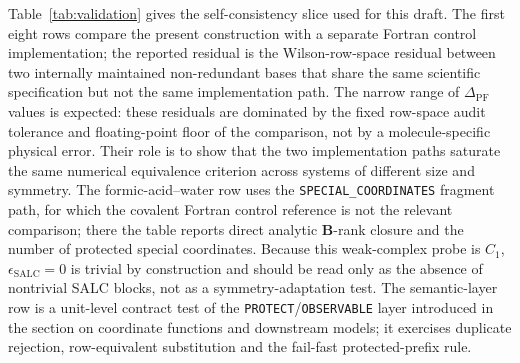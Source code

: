 \documentclass[journal=jctcce,manuscript=article,layout=traditional]{achemso}
\newcommand{\Bmat}{\mathbf{B}}
\theoremstyle{definition}
\begin{document}
Table~\ref{tab:validation} gives the self-consistency slice used for
this draft.  The first eight rows compare the present construction with a
separate Fortran control implementation; the reported residual is the
Wilson-row-space residual between two internally maintained non-redundant bases
that share the same scientific specification but not the same implementation
path.
The narrow range of
\(\Delta_\mathrm{PF}\) values is expected: these residuals are dominated by the
fixed row-space audit tolerance and floating-point floor of the comparison, not
by a molecule-specific physical error.  Their role is to show that the two
implementation paths saturate the same numerical equivalence criterion across
systems of different size and symmetry.  The formic-acid--water row uses the
\texttt{SPECIAL\_COORDINATES} fragment path, for which the covalent Fortran
control reference is not the relevant comparison; there the table reports direct
analytic \(\Bmat\)-rank closure and the number of protected special coordinates.
Because this weak-complex probe is \(C_1\), \(\epsilon_\mathrm{SALC}=0\) is
trivial by construction and should be read only as the absence of nontrivial
SALC blocks, not as a symmetry-adaptation test.  The semantic-layer row is
a unit-level contract test of the \texttt{PROTECT}/\texttt{OBSERVABLE} layer
introduced in the section on coordinate functions and downstream models; it
exercises duplicate rejection, row-equivalent substitution and the fail-fast
protected-prefix rule.
\end{document}
